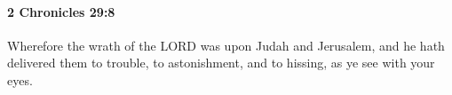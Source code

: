 
		\paragraph{2 Chronicles 29:8} %
			\label{2CHRONICLES-29-8}

			Wherefore the wrath of the LORD was upon Judah and Jerusalem, and he hath delivered them to trouble, to astonishment, and to hissing, as ye see with your eyes.


